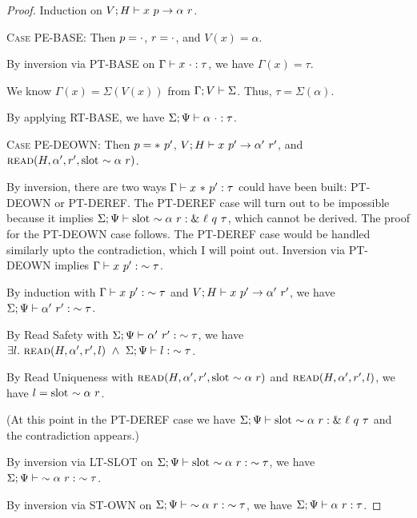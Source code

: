 \documentclass{article}
\begin{document}
\begin{proof}
  Induction on ${{V};{H}} \vdash {{x}\ {p}} \rightarrow {{\alpha}\ {r}}$.

  \textsc{Case PE-BASE}:
    Then $p = \cdot$, $r = \cdot$, and $V(x) = \alpha$.

    By inversion via \textsc{PT-BASE} on ${{\Gamma}} \vdash {{x}\ {\cdot}} : {{\tau}}$, we have $\Gamma(x)=\tau$.

    We know $\Gamma(x) = \Sigma(V(x))$ from ${\Gamma}; {V} \vdash {\Sigma}$.
    Thus, $\tau = \Sigma(\alpha)$.

    By applying \textsc{RT-BASE}, we have ${{{\Sigma}} ;{{\Psi}}} \vdash {{{\alpha}\ {\cdot}}} : {{{\tau}}}$.

  \textsc{Case PE-DEOWN}:
    Then $p = *\ {p'}$, ${{V};{H}} \vdash {{x}\ {p'}} \rightarrow {{\alpha'}\ {r'}}$,
    and $\textsc{read}({H},{\alpha'},{r'},{\textrm{slot}\ {\sim {{\alpha}\ {r}}}})$.

    By inversion, there are two ways ${{\Gamma}} \vdash {{x}\ {*\ {p'}}} : {{\tau}}$ could have been built:
    \textsc{PT-DEOWN} or \textsc{PT-DEREF}. The \textsc{PT-DEREF} case will turn out to be
    impossible because it implies
    ${{\Sigma} ;{\Psi}} \vdash {{\textrm{slot}\ {\sim {{\alpha}\ {r}}}}} : {{\&\ {\ell}\ {q}\ {\tau}}}$, which cannot be
    derived. The proof for the \textsc{PT-DEOWN} case follows. The \textsc{PT-DEREF} case would
    be handled similarly upto the contradiction, which I will point out.
    Inversion via \textsc{PT-DEOWN} implies ${{\Gamma}} \vdash {{x}\ {p'}} : {{\sim {\tau}}}$.

    By induction with ${{\Gamma}} \vdash {{x}\ {p'}} : {{\sim {\tau}}}$ and ${{V};{H}} \vdash {{x}\ {p'}} \rightarrow {{\alpha'}\ {r'}}$,
    we have ${{{\Sigma}} ;{{\Psi}}} \vdash {{{\alpha'}\ {r'}}} : {{{\sim {\tau}}}}$.

    By Read Safety with ${{{\Sigma}} ;{{\Psi}}} \vdash {{{\alpha'}\ {r'}}} : {{{\sim {\tau}}}}$, we have
    $\exists l.\ \Read{H}{\alpha'}{r'}{l}\ \land\ \RTType{\Sigma}{\Psi}{l}{\Own{\tau}}$.

    By Read Uniqueness with $\textsc{read}({H},{\alpha'},{r'},{\textrm{slot}\ {\sim {{\alpha}\ {r}}}})$ and
    $\textsc{read}({H},{\alpha'},{r'},{l})$, we have $l = \textrm{slot}\ {\sim {{\alpha}\ {r}}}$.

    (At this point in the \textsc{PT-DEREF} case we have 
    ${{\Sigma} ;{\Psi}} \vdash {{\textrm{slot}\ {\sim {{\alpha}\ {r}}}}} : {{\&\ {\ell}\ {q}\ {\tau}}}$
    and the contradiction appears.)

    By inversion via \textsc{LT-SLOT} on
    ${{\Sigma} ;{\Psi}} \vdash {{\textrm{slot}\ {\sim {{\alpha}\ {r}}}}} : {{\sim {\tau}}}$, we have
    ${{\Sigma} ;{\Psi}} \vdash {{\sim {{\alpha}\ {r}}}} : {{\sim {\tau}}}$.

    By inversion via \textsc{ST-OWN} on
    ${{\Sigma} ;{\Psi}} \vdash {{\sim {{\alpha}\ {r}}}} : {{\sim {\tau}}}$, we have
    ${{{\Sigma}} ;{{\Psi}}} \vdash {{{\alpha}\ {r}}} : {{{\tau}}}$.


\end{proof}
\end{document}
